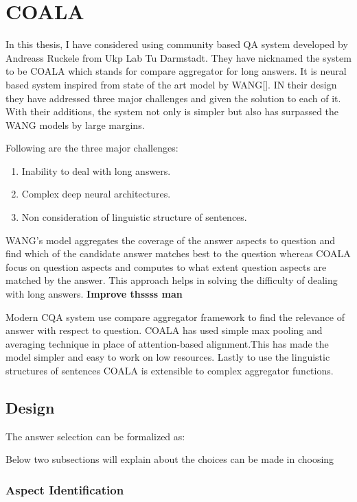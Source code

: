 \documentclass[11pt]{article}
\begin{document}
\section{COALA}

In this thesis, I have considered using community based QA system developed by Andreass Ruckele from Ukp Lab Tu Darmstadt. They have nicknamed the system to be COALA which stands for compare aggregator for long answers.
It is neural based system inspired from state of the art model by WANG[]. IN their design they have addressed three major challenges and given the solution to each of it. With their additions, the system not only is simpler but also has surpassed the WANG models by large margins.




Following are the three major challenges:
\begin {enumerate}

\item Inability to deal with long answers.
\item Complex deep neural architectures.
\item Non consideration of linguistic structure of sentences.
\end {enumerate}

WANG's model aggregates the coverage of the answer aspects to question and find which of the candidate answer matches best to the question whereas COALA focus on  question aspects and computes to what extent question aspects are matched by the answer. This approach helps in solving the difficulty of dealing with long answers.
\textbf {Improve thssss man}

Modern CQA system use compare aggregator framework to find the relevance of answer with respect to question. COALA has used simple max pooling  and averaging technique in place of attention-based alignment.This has made the model simpler and easy to work on low resources. Lastly to use the linguistic structures of sentences COALA is extensible to complex aggregator functions.

\subsection{Design}

The answer selection can be formalized as:



Below two subsections will explain about the choices can be made in choosing 

\subsubsection{Aspect Identification}
\end{document}
